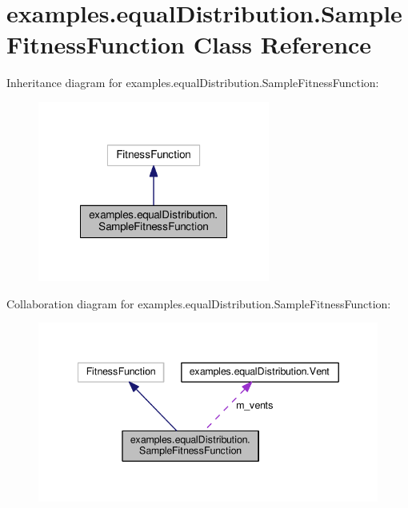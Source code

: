 \hypertarget{classexamples_1_1equal_distribution_1_1_sample_fitness_function}{\section{examples.\-equal\-Distribution.\-Sample\-Fitness\-Function Class Reference}
\label{classexamples_1_1equal_distribution_1_1_sample_fitness_function}
}


Inheritance diagram for examples.\-equal\-Distribution.\-Sample\-Fitness\-Function\-:
\nopagebreak
\begin{figure}[H]
\begin{center}
\leavevmode
\includegraphics[width=216pt]{classexamples_1_1equal_distribution_1_1_sample_fitness_function__inherit__graph}
\end{center}
\end{figure}


Collaboration diagram for examples.\-equal\-Distribution.\-Sample\-Fitness\-Function\-:
\nopagebreak
\begin{figure}[H]
\begin{center}
\leavevmode
\includegraphics[width=341pt]{classexamples_1_1equal_distribution_1_1_sample_fitness_function__coll__graph}
\end{center}
\end{figure}
